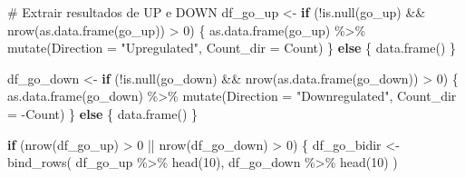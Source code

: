 \documentclass[
  letterpaper,
  DIV=11,
  numbers=noendperiod]{scrreprt}
\newenvironment{Shaded}{\begin{snugshade}}{\end{snugshade}}
\newcommand{\AttributeTok}[1]{\textcolor[rgb]{0.40,0.45,0.13}{#1}}
\newcommand{\CommentTok}[1]{\textcolor[rgb]{0.37,0.37,0.37}{#1}}
\newcommand{\ControlFlowTok}[1]{\textcolor[rgb]{0.00,0.23,0.31}{\textbf{#1}}}
\newcommand{\DecValTok}[1]{\textcolor[rgb]{0.68,0.00,0.00}{#1}}
\newcommand{\FunctionTok}[1]{\textcolor[rgb]{0.28,0.35,0.67}{#1}}
\newcommand{\NormalTok}[1]{\textcolor[rgb]{0.00,0.23,0.31}{#1}}
\newcommand{\OtherTok}[1]{\textcolor[rgb]{0.00,0.23,0.31}{#1}}
\newcommand{\SpecialCharTok}[1]{\textcolor[rgb]{0.37,0.37,0.37}{#1}}
\newcommand{\StringTok}[1]{\textcolor[rgb]{0.13,0.47,0.30}{#1}}
\begin{document}
\begin{Shaded}
\begin{Highlighting}[]
\CommentTok{\# Extrair resultados de UP e DOWN}
\NormalTok{df\_go\_up }\OtherTok{\textless{}{-}} \ControlFlowTok{if}\NormalTok{ (}\SpecialCharTok{!}\FunctionTok{is.null}\NormalTok{(go\_up) }\SpecialCharTok{\&\&} \FunctionTok{nrow}\NormalTok{(}\FunctionTok{as.data.frame}\NormalTok{(go\_up)) }\SpecialCharTok{\textgreater{}} \DecValTok{0}\NormalTok{) \{}
  \FunctionTok{as.data.frame}\NormalTok{(go\_up) }\SpecialCharTok{\%\textgreater{}\%} \FunctionTok{mutate}\NormalTok{(}\AttributeTok{Direction =} \StringTok{"Upregulated"}\NormalTok{, }\AttributeTok{Count\_dir =}\NormalTok{ Count)}
\NormalTok{\} }\ControlFlowTok{else}\NormalTok{ \{ }\FunctionTok{data.frame}\NormalTok{() \}}

\NormalTok{df\_go\_down }\OtherTok{\textless{}{-}} \ControlFlowTok{if}\NormalTok{ (}\SpecialCharTok{!}\FunctionTok{is.null}\NormalTok{(go\_down) }\SpecialCharTok{\&\&} \FunctionTok{nrow}\NormalTok{(}\FunctionTok{as.data.frame}\NormalTok{(go\_down)) }\SpecialCharTok{\textgreater{}} \DecValTok{0}\NormalTok{) \{}
  \FunctionTok{as.data.frame}\NormalTok{(go\_down) }\SpecialCharTok{\%\textgreater{}\%} \FunctionTok{mutate}\NormalTok{(}\AttributeTok{Direction =} \StringTok{"Downregulated"}\NormalTok{, }\AttributeTok{Count\_dir =} \SpecialCharTok{{-}}\NormalTok{Count)}
\NormalTok{\} }\ControlFlowTok{else}\NormalTok{ \{ }\FunctionTok{data.frame}\NormalTok{() \}}

\ControlFlowTok{if}\NormalTok{ (}\FunctionTok{nrow}\NormalTok{(df\_go\_up) }\SpecialCharTok{\textgreater{}} \DecValTok{0} \SpecialCharTok{||} \FunctionTok{nrow}\NormalTok{(df\_go\_down) }\SpecialCharTok{\textgreater{}} \DecValTok{0}\NormalTok{) \{}
\NormalTok{  df\_go\_bidir }\OtherTok{\textless{}{-}} \FunctionTok{bind\_rows}\NormalTok{(}
\NormalTok{    df\_go\_up }\SpecialCharTok{\%\textgreater{}\%} \FunctionTok{head}\NormalTok{(}\DecValTok{10}\NormalTok{),}
\NormalTok{    df\_go\_down }\SpecialCharTok{\%\textgreater{}\%} \FunctionTok{head}\NormalTok{(}\DecValTok{10}\NormalTok{)}
\NormalTok{  )}


\end{Highlighting}
\end{Shaded}
\end{document}
